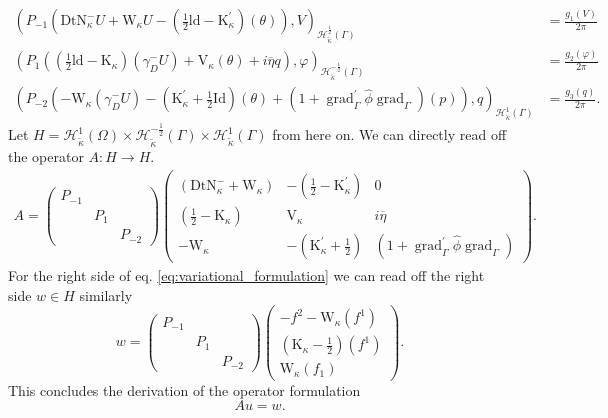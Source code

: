 \documentclass[12pt,journal,compsoc, onecolumn]{IEEEtran}
\begin{document}
\begin{align}
    \left(P_{-1}\left(\mathrm{DtN}^-_{ \kappa}U + \mathrm{W}_{\kappa}U - \left(\frac{1}{2} \mathrm{ld}-\mathrm{K}_{\kappa}^{\prime}\right)\left(\theta\right)\right), V\right)_{{\mathcal{H}_{\tilde\kappa}^\frac{1}{2}(\Gamma)}} &=\frac{g_1(V)}{2\pi} \nonumber\\
    \left(P_1 \left(\left(\frac{1}{2} \mathrm{ld}-\mathrm{K}_{\kappa}\right)\left(\gamma_{D}^{-} U\right)  + \mathrm{V}_{\kappa}\left(\theta\right) + i \overline{\eta} q \right), \varphi \right)_{{\mathcal{H}_{\tilde\kappa}^{-\frac{1}{2}}(\Gamma)}}
    &=\frac{g_2(\varphi)}{2\pi}  \nonumber\\
    \left(P_{-2} \left( -\mathrm{W}_{\kappa}\left(\gamma_{D}^{-} U\right) - \left(\mathrm{K}_{\kappa}^{\prime}+\frac{1}{2} \mathrm{Id}\right)(\theta)+ \left(1+\operatorname{grad}_{\Gamma}^{\prime} \hat{\phi} \operatorname{grad}_{\Gamma}\right)(p) \right), q \right)_{{\mathcal{H}_{\tilde\kappa}^{1}(\Gamma)}}
    &=\frac{g_3(q)}{2\pi}. \nonumber
\end{align}
\noindent Let $H = \mathcal{H}_{\tilde \kappa}^1(\Omega) \times \mathcal{H}_{\tilde \kappa}^{-\frac{1}{2}}(\Gamma) \times \mathcal{H}_{\tilde \kappa}^{1}(\Gamma)$ from here on.  We can directly read off the operator  $A: H \rightarrow H$. 
\begin{align*}
 A = \begin{pmatrix}
     P_{-1} & & \\ & P_{1}& \\ & & P_{-2}
 \end{pmatrix}
 \begin{pmatrix}
            (\mathrm{DtN}_{ \kappa}^{-} + \mathrm{W}_{ \kappa})  & - (\frac{1}{2} - \mathrm{K}^\prime_{ \kappa}) & 0 \\
            (\frac{1}{2} - \mathrm{K}_{ \kappa}) & \mathrm{V}_{ \kappa} & i \overline{\eta} \\
            - \mathrm{W}_{ \kappa} & - (\mathrm{K}^\prime_{ \kappa} + \frac{1}{2}) & \left(1 + \operatorname{grad}_{\Gamma}^\prime \hat{\phi}\operatorname{grad}_{\Gamma} \right)
\end{pmatrix}.
\end{align*}
\noindent
For the right side of eq. \ref{eq:variational_formulation} we can read off the right side $w \in H$ similarly
$$
w = \begin{pmatrix}
     P_{-1} & & \\ & P_{1}& \\ & & P_{-2}
 \end{pmatrix}
 \begin{pmatrix}
 -f^2 -\mathrm{W}_\kappa (f^1) \\ 
 (\mathrm{K}_\kappa - \frac{1}{2})(f^1) \\ 
 \mathrm{W}_\kappa(f_1)
 \end{pmatrix}.
$$
This concludes the derivation of the operator formulation 
\begin{equation}
    \label{eq:operator_formulation}
    Au = w.
\end{equation}
\end{document}
